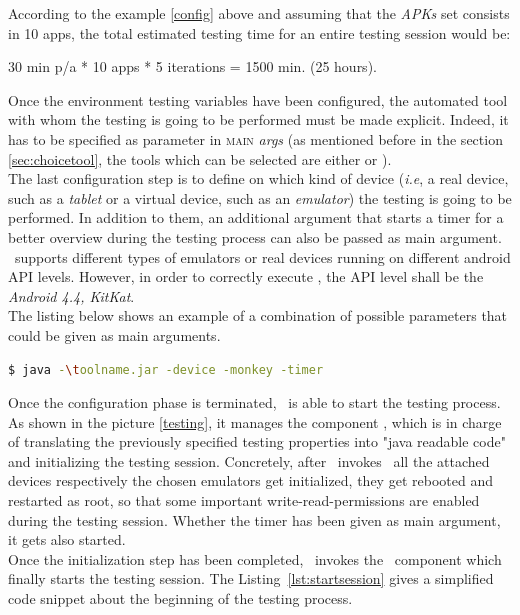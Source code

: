 According to the example \ref{config} above and assuming that the \textit{APKs} set consists in 10 apps, the total estimated testing time for an entire testing session would be: 
\begin{center}
30 min p/a * 10 apps * 5 iterations = 1500 min. (25 hours). 
\end{center}
Once the environment testing variables have been configured, the automated tool with whom the testing is going to be performed must be made explicit. Indeed, it has to be specified as parameter in \textsc{main} \textit{args} (as mentioned before in the section \ref{sec:choicetool}, the tools which can be selected are either \monkey or \sapienz). \\
The last configuration step is to define on which kind of device (\textit{i.e}, a real device, such as a \textit{tablet} or a virtual device, such as an \textit{emulator}) the testing is going to be performed. In addition to them, an additional argument that starts a timer for a better overview during the testing process can also be passed as main argument. \toolname\ supports different types of emulators or real devices running on different android API levels. However, in order to correctly execute \sapienz, the API level shall be the \textit{Android 4.4, KitKat}. \\
The listing below shows an example of a combination of possible parameters that could be given as main arguments. 


\begin{lstlisting}[caption=\toolname\ command line, language=bash]
$ java -\toolname.jar -device -monkey -timer
\end{lstlisting}

Once the configuration phase is terminated, \toolname\ is able to start the testing process. 
As shown in the picture \ref{testing}, it manages the component \SessionLauncher, which is in charge of translating the previously specified testing properties into "java readable code" and initializing the testing session. 
Concretely, after \toolname\ invokes \SessionLauncher\ all the attached devices respectively the chosen emulators get initialized, \ie they get rebooted and restarted as root, so that some important write-read-permissions are enabled during the testing session. 
Whether the timer has been given as main argument, it gets also started. \\
Once the initialization step has been completed, \SessionLauncher\  invokes the \AppTester\ component which finally starts the testing session. The Listing~\ref{lst:startsession} gives a simplified code snippet about the beginning of the testing process. 

